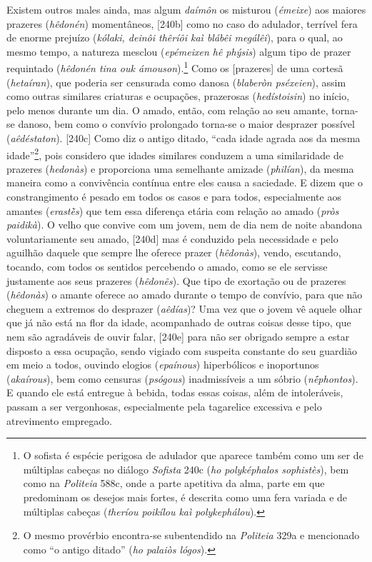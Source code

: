 Existem outros males ainda, mas algum \emph{daímôn} os misturou
(\emph{émeixe}) aos maiores prazeres (\emph{hêdonén}) momentâneos,
{[}240b{]} como no caso do adulador, terrível fera de enorme prejuízo
(\emph{kólaki, deinôi thêríôi kaì blábêi megálêi}), para o qual, ao
mesmo tempo, a natureza mesclou (\emph{epémeixen hê phýsis}) algum tipo
de prazer requintado (\emph{hêdonén tina ouk ámouson}).\footnote{O
  sofista é espécie perigosa de adulador que aparece também como um ser
  de múltiplas cabeças no diálogo \emph{Sofista} 240c (\emph{ho
  polyképhalos sophistès}), bem como na \emph{Politeia} 588c, onde a
  parte apetitiva da alma, parte em que predominam os desejos mais
  fortes, é descrita como uma fera variada e de múltiplas cabeças
  (\emph{theríou poikílou kaì polykephálou}).} Como os {[}prazeres{]} de
uma cortesã (\emph{hetaíran}), que poderia ser censurada como danosa
(\emph{blaberòn pséxeien}), assim como outras similares criaturas e
ocupações, prazerosas (\emph{hedístoisin}) no início, pelo menos durante
um dia. O amado, então, com relação ao seu amante, torna-se danoso, bem
como o convívio prolongado torna-se o maior desprazer possível
(\emph{aêdéstaton}). {[}240c{]} Como diz o antigo ditado, ``cada idade
agrada aos da mesma idade''\footnote{O mesmo provérbio encontra-se
  subentendido na \emph{Politeia} 329a e mencionado como ``o antigo
  ditado'' (\emph{ho palaiòs lógos}).}, pois considero que
\protect\hypertarget{setaDir}{}{}idades similares conduzem a uma
similaridade de prazeres (\emph{hedonàs}) e proporciona uma semelhante
amizade (\emph{philían}), da mesma maneira como a convivência contínua
entre eles causa a saciedade. E dizem que o constrangimento é pesado em
todos os casos e para todos, especialmente aos amantes (\emph{erastḕs})
que tem essa diferença etária com relação ao amado (\emph{pròs
paidikà}). O velho que convive com um jovem, nem de dia nem de noite
abandona voluntariamente seu amado, {[}240d{]} mas é conduzido pela
necessidade e pelo aguilhão daquele que sempre lhe oferece prazer
(\emph{hêdonàs}), vendo, escutando, tocando, com todos os sentidos
percebendo o amado, como se ele servisse justamente aos seus prazeres
(\emph{hêdonês}). Que tipo de exortação ou de prazeres (\emph{hêdonàs})
o amante oferece ao amado durante o tempo de convívio, para que não
cheguem a extremos do desprazer (\emph{aêdías})? Uma vez que o jovem vê
aquele olhar que já não está na flor da idade, acompanhado de outras
coisas desse tipo, que nem são agradáveis de ouvir falar, {[}240e{]}
para não ser obrigado sempre a estar disposto a essa ocupação, sendo
vigiado com suspeita constante do seu guardião em meio a todos, ouvindo
elogios (\emph{epaínous}) hiperbólicos e inoportunos (\emph{akaírous}),
bem como censuras (\emph{psógous}) inadmissíveis a um sóbrio
(\emph{nḗphontos}). E quando ele está entregue à bebida, todas essas
coisas, além de intoleráveis, passam a ser vergonhosas, especialmente
pela tagarelice excessiva e pelo atrevimento empregado.

